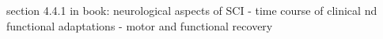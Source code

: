 section 4.4.1 in book: neurological aspects of SCI 
- time course of clinical nd functional adaptations
	- motor and functional recovery















